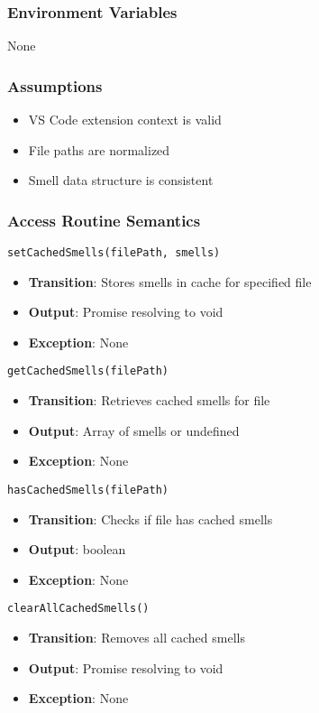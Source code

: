 \documentclass[12pt, titlepage]{article}
\begin{document}
\subsubsection{Environment Variables}
None

\subsubsection{Assumptions}
\begin{itemize}
\item VS Code extension context is valid
\item File paths are normalized
\item Smell data structure is consistent
\end{itemize}

\subsubsection{Access Routine Semantics}
\texttt{setCachedSmells(filePath, smells)}
\begin{itemize}
\item \textbf{Transition}: Stores smells in cache for specified file
\item \textbf{Output}: Promise resolving to void
\item \textbf{Exception}: None
\end{itemize}

\texttt{getCachedSmells(filePath)}
\begin{itemize}
\item \textbf{Transition}: Retrieves cached smells for file
\item \textbf{Output}: Array of smells or undefined
\item \textbf{Exception}: None
\end{itemize}

\texttt{hasCachedSmells(filePath)}
\begin{itemize}
\item \textbf{Transition}: Checks if file has cached smells
\item \textbf{Output}: boolean
\item \textbf{Exception}: None
\end{itemize}

\texttt{clearAllCachedSmells()}
\begin{itemize}
\item \textbf{Transition}: Removes all cached smells
\item \textbf{Output}: Promise resolving to void
\item \textbf{Exception}: None
\end{itemize}
\end{document}

